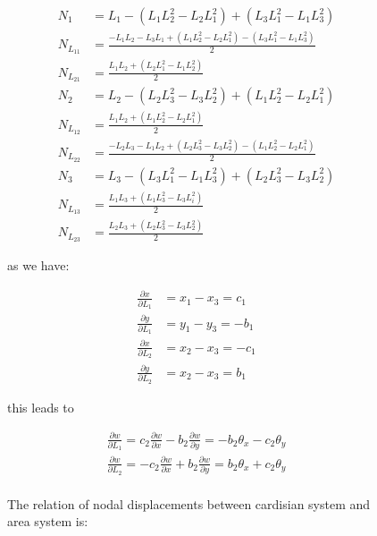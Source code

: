 \begin{figure}[h!]
\begin{align*}
	N_1 &= L_1 -(L_1 L_2^2 - L_2 L_1^2) + (L_3 L_1^2 - L_1 L_3^2) \\
	N_{L_{11}} &= \frac{-L_1 L_2 - L_3 L_1 + (L_1 L_2^2 - L_2 L_1^2) - (L_3 L_1^2 - L_1 L_3^2)}{2} \\
	N_{L_{21}} &= \frac{L_1 L_2 + (L_2 L_1^2 - L_1 L_2^2)}{2} \\
	N_{2} &= L_2 -(L_2 L_3^2-L_3 L_2^2) + (L_1 L_2^2 -L_2 L_1^2) \\
	N_{L_{12}} &= \frac{L_1 L_2 + (L_1 L_2^2 - L_2 L_1^2)}{2} \\
	N_{L_{22}} &= \frac{-L_2 L_3 - L_1 L_2 +(L_2 L_3^2-L_3 L_2^2)- (L_1 L_2^2 - L_2 L_1^2)}{2} \\
	N_3 &= L_3 - (L_3 L_1^2 -L_1 L_3^2) + (L_2 L_3^2 - L_3 L_2^2) \\
	N_{L_{13}} &= \frac{L_1 L_3 + (L_1 L_3^2 - L_3 L_i^2)}{2} \\
	N_{L_{23}} &= \frac{L_2 L_3 + (L_2 L_3^2 - L_3 L_2^2)}{2}
\end{align*}

as we have:

\begin{equation}
\begin{split}
\frac{\partial x}{\partial L_1} &= x_1 - x_3 = c_1 \\
\frac{\partial y}{\partial L_1} &= y_1 - y_3 = -b_1 \\
\frac{\partial x}{\partial L_2} &= x_2 - x_3 = -c_1 \\
\frac{\partial y}{\partial L_2} &= x_2 - x_3 = b_1
\end{split}
\end{equation}

this leads to

\begin{equation}\label{key}
\begin{split}
\frac{\partial w}{\partial L_1} = c_2 \frac{\partial w}{\partial x} - b_2 \frac{\partial w}{\partial y} = -b_2 \theta_x - c_2 \theta_y \\
\frac{\partial w}{\partial L_2} = -c_2 \frac{\partial w}{\partial x} + b_2 \frac{\partial w}{\partial y} = b_2 \theta_x + c_2 \theta_y \\
\end{split}
\end{equation}

The relation of nodal displacements between cardisian system and area system is:


\end{figure}
